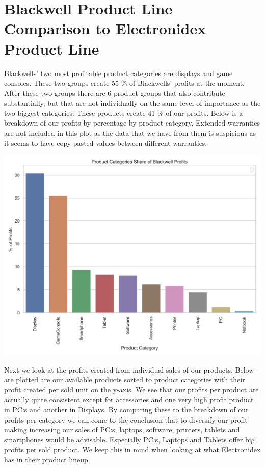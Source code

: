 \documentclass[12pt,a4paper,leqno]{report}
\theoremstyle{plain}
\theoremstyle{definition}
\theoremstyle{remark}
\begin{document}
\section{Blackwell Product Line Comparison to Electronidex Product Line}

Blackwells' two most profitable product categories are displays and game consoles. These two groups
create 55 \% of Blackwells' profits at the moment. After these two groups
there are 6 product groups that also contribute substantially, but that are not individually on the same
level of importance as the two biggest categories. These products create 41 \% of our profits.
Below is a breakdown of our profits by percentage by product category. Extended warranties are not included
in this plot as the data that we have from them is suspicious as it seems to have copy pasted values
between different warranties.

\bigskip
{
    \centering
    \includegraphics[width=\textwidth,height=\textheight,keepaspectratio]{blackwell_profits_share_by_product_category.png}
    \par
}
\bigskip

Next we look at the profits created from individual sales of our products. Below are plotted are our available
products sorted to product categories with their profit created per sold unit on the y-axis.
We see that our profits per product are actually quite consistent except for accessories
and one very high profit product in PC:s and another in Displays.
By comparing these to the breakdown of our profits per category we can come to the conclusion that to diversify
our profit making increasing our sales of PC:s, laptops, software, printers, tablets and smartphones would be
advisable. Especially PC:s, Laptops and Tablets offer big profits per sold product. We keep this in mind
when looking at what Electronidex has in their product lineup.
\end{document}
